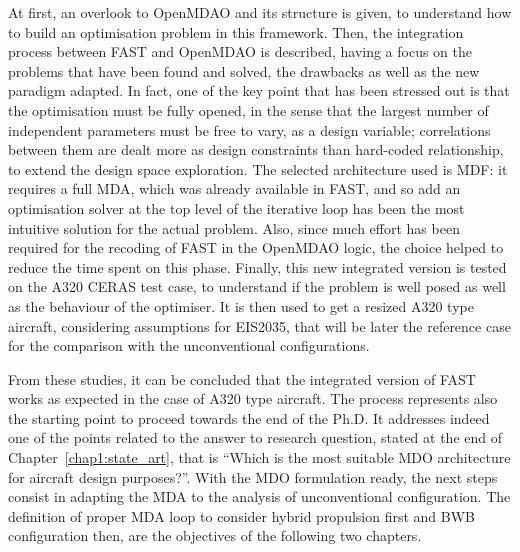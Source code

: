 At first, an overlook to OpenMDAO and its structure is given, to understand how to build an optimisation problem in this framework. 
Then, the integration process between FAST and OpenMDAO is described, having a focus on the problems that have been found and solved, the drawbacks as well as the new paradigm adapted. 
In fact, one of the key point that has been stressed out is that the optimisation must be fully opened, in the sense that the largest number of independent parameters must be free to vary, as a design variable; correlations between them are dealt more as design constraints than hard-coded relationship, to extend the design space exploration. 
The selected architecture used is MDF: it requires a full MDA, which was already available in FAST, and so add an optimisation solver at the top level of the iterative loop has been the most intuitive solution for the actual problem. 
Also, since much effort has been required for the recoding of FAST in the OpenMDAO logic, the choice helped to reduce the time spent on this phase. 
Finally, this new integrated version is tested on the A320 CERAS test case, to understand if the problem is well posed as well as the behaviour of the optimiser.
It is then used to get a resized A320 type aircraft, considering assumptions for EIS2035, that will be later the reference case for the comparison with the unconventional configurations. 

From these studies, it can be concluded that the integrated version of FAST works as expected in the case of A320 type aircraft. 
The process represents also the starting point to proceed towards the end of the Ph.D. 
It addresses indeed one of the points related to the answer to research question, stated at the end of Chapter~\ref{chap1:state_art}, that is ``Which is the most suitable MDO architecture for aircraft design purposes?''. 
With the MDO formulation ready, the next steps consist in adapting the MDA to the analysis of unconventional configuration. 
The definition of proper MDA loop to consider hybrid propulsion first and BWB configuration then, are the objectives of the following two chapters. 

\clearpage

